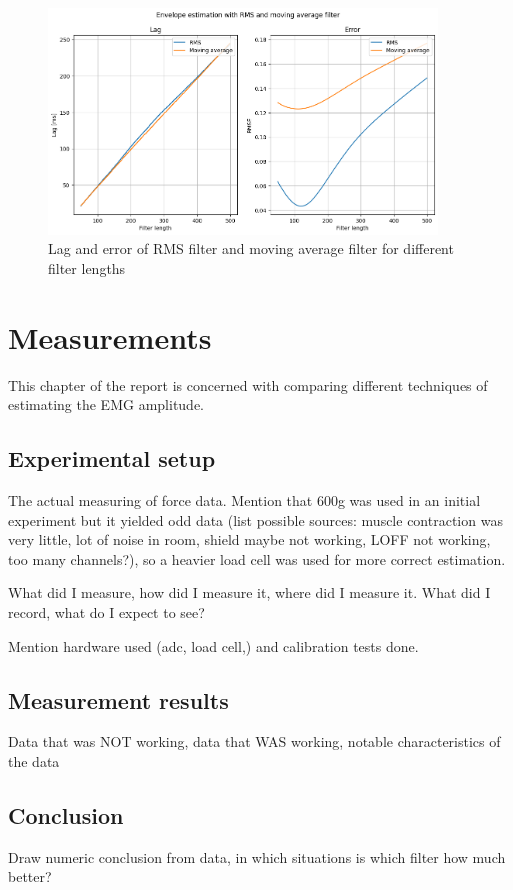\begin{figure}[h!t]
	\begin{center}
		\includegraphics[height=60mm]{images/lagerror_rms_and_MA_filter.png}
	\end{center}
	\caption{Lag and error of RMS filter and moving average filter for different filter lengths}
	\label{fig:lagerror_RMS_MA}
\end{figure}














\chapter{Measurements}
This chapter of the report is concerned with comparing different techniques of estimating the EMG amplitude.

\section{Experimental setup}
The actual measuring of force data. Mention that 600g was used in an initial experiment but it yielded odd data (list possible sources: muscle contraction was very little, lot of noise in room, shield maybe not working, LOFF not working, too many channels?), so a heavier load cell was used for more correct estimation.

What did I measure, how did I measure it, where did I measure it. What did I record, what do I expect to see?

Mention hardware used (adc, load cell,) and calibration tests done.
\section{Measurement results}
Data that was NOT working, data that WAS working, notable characteristics of the data


\section{Conclusion}
Draw numeric conclusion from data, in which situations is which filter how much better?